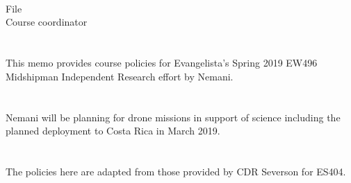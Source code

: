 \documentclass[10pt,courier]{navymemo}
\begin{document}
\noclosing{}\\
\noindent\hspace*{4in}
\signature{D Evangelista}

\noindent\hspace*{4in}{235 Maury Hall}\\
\hspace*{4in}{(410) 293-6132}\\

\copyto{}
File\\
Course coordinator


\navyrecordnote
\thispagestyle{empty}


\navyrecordnotesubjline

\section{} This memo provides course policies for Evangelista's Spring 2019 EW496 Midshipman Independent Research effort by Nemani.

\section{} Nemani will be planning for drone missions in support of science including the planned deployment to Costa Rica in March 2019.  

\section{}  The policies here are adapted from those provided by CDR Severson for ES404.  
\end{document}
